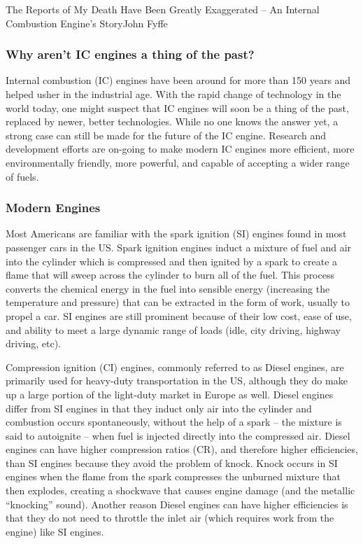 \documentclass{papertex}
\begin{document}
\begin{news}{2}{The Reports of My Death Have Been Greatly Exaggerated -- An Internal Combustion Engine’s Story}{John Fyffe}{}{}

\subsubsection*{Why aren’t IC engines a thing of the past?}

Internal combustion (IC) engines have been around for more than 150 years and 
helped usher in the industrial age.  With the rapid change of technology in 
the world today, one might suspect that IC engines will soon be a thing of 
the past, replaced by newer, better technologies.  While no one knows the 
answer yet, a strong case can still be made for the future of the IC engine.  
Research and development efforts are on-going to make modern IC engines more 
efficient, more environmentally friendly, more powerful, and capable of 
accepting a wider range of fuels.


\subsubsection*{Modern Engines}

Most Americans are familiar with the spark ignition (SI) engines found in most 
passenger cars in the US.  Spark ignition engines induct a mixture of fuel and 
air into the cylinder which is compressed and then ignited by a spark to create 
a flame that will sweep across the cylinder to burn all of the fuel.  This 
process converts the chemical energy in the fuel into sensible energy 
(increasing the temperature and pressure) that can be extracted in the form 
of work, usually to propel a car.  SI engines are still prominent because of 
their low cost, ease of use, and ability to meet a large dynamic range of 
loads (idle, city driving, highway driving, etc).

Compression ignition (CI) engines, commonly referred to as Diesel engines, 
are primarily used for heavy-duty transportation in the US, although they 
do make up a large portion of the light-duty market in Europe as well.  
Diesel engines differ from SI engines in that they induct only air into 
the cylinder and combustion occurs spontaneously, without the help of a 
spark – the mixture is said to autoignite – when fuel is injected directly 
into the compressed air.  Diesel engines can have higher compression ratios 
(CR), and therefore higher efficiencies, than SI engines because they avoid 
the problem of knock.  Knock occurs in SI engines when the flame from the 
spark compresses the unburned mixture that then explodes, creating a shockwave 
that causes engine damage (and the metallic “knocking” sound).  Another reason 
Diesel engines can have higher efficiencies is that they do not need to 
throttle the inlet air (which requires work from the engine) like SI engines.


\end{news}
\end{document}
